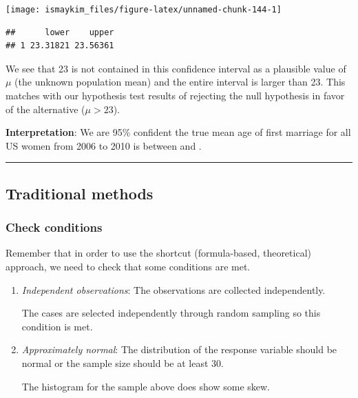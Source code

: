 \documentclass[]{tufte-book}
\newenvironment{Shaded}{\begin{snugshade}}{\end{snugshade}}
\newcommand{\KeywordTok}[1]{\textcolor[rgb]{0.13,0.29,0.53}{\textbf{{#1}}}}
\newcommand{\DataTypeTok}[1]{\textcolor[rgb]{0.13,0.29,0.53}{{#1}}}
\newcommand{\FloatTok}[1]{\textcolor[rgb]{0.00,0.00,0.81}{{#1}}}
\newcommand{\StringTok}[1]{\textcolor[rgb]{0.31,0.60,0.02}{{#1}}}
\newcommand{\NormalTok}[1]{{#1}}
\let\oldrule=\rule
\renewcommand{\rule}[1]{\oldrule{\linewidth}}
\begin{document}
\begin{center}\texttt{[image: ismaykim\_files/figure-latex/unnamed-chunk-144-1]} \end{center}

\begin{Shaded}
\end{Shaded}

\begin{verbatim}
##      lower    upper
## 1 23.31821 23.56361
\end{verbatim}

We see that 23 is not contained in this confidence interval as a
plausible value of \(\mu\) (the unknown population mean) and the entire
interval is larger than 23. This matches with our hypothesis test
results of rejecting the null hypothesis in favor of the alternative
(\(\mu > 23\)).

\textbf{Interpretation}: We are 95\% confident the true mean age of
first marriage for all US women from 2006 to 2010 is between and .

\begin{center}\rule{0.5\linewidth}{\linethickness}\end{center}

\subsection{Traditional methods}\label{traditional-methods}

\subsubsection{Check conditions}\label{check-conditions}

Remember that in order to use the shortcut (formula-based, theoretical)
approach, we need to check that some conditions are met.

\begin{enumerate}
\def\labelenumi{\arabic{enumi}.}
\item
  \emph{Independent observations}: The observations are collected
  independently.

  The cases are selected independently through random sampling so this
  condition is met.
\item
  \emph{Approximately normal}: The distribution of the response variable
  should be normal or the sample size should be at least 30.

  The histogram for the sample above does show some skew.
\end{enumerate}
\end{document}
